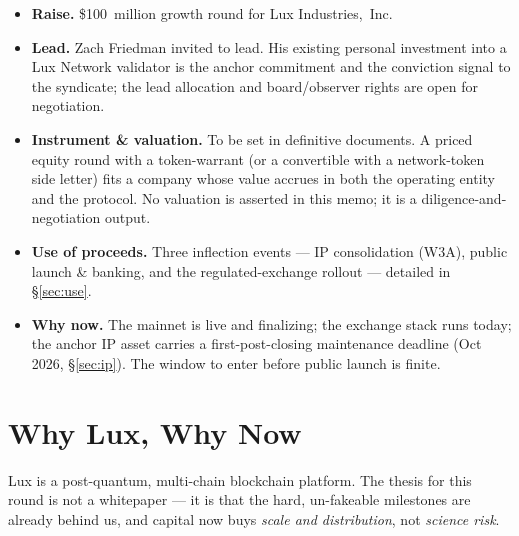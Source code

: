 \documentclass[11pt,a4paper]{article}
\begin{document}
\begin{itemize}[leftmargin=1.4em]
  \item \textbf{Raise.} \$100~million growth round for Lux Industries,~Inc.
  \item \textbf{Lead.} Zach Friedman invited to lead. His existing personal
  investment into a Lux Network validator is the anchor commitment and the
  conviction signal to the syndicate; the lead allocation and board/observer
  rights are open for negotiation.
  \item \textbf{Instrument \& valuation.} To be set in definitive documents.
  A priced equity round with a token-warrant (or a convertible with a
  network-token side letter) fits a company whose value accrues in both the
  operating entity and the protocol. No valuation is asserted in this memo;
  it is a diligence-and-negotiation output.
  \item \textbf{Use of proceeds.} Three inflection events --- IP
  consolidation (W3A), public launch \& banking, and the regulated-exchange
  rollout --- detailed in \S\ref{sec:use}.
  \item \textbf{Why now.} The mainnet is live and finalizing; the exchange
  stack runs today; the anchor IP asset carries a first-post-closing
  maintenance deadline (Oct 2026, \S\ref{sec:ip}). The window to enter
  before public launch is finite.
\end{itemize}

\section{Why Lux, Why Now}

Lux is a post-quantum, multi-chain blockchain platform. The thesis for this
round is not a whitepaper --- it is that the hard, un-fakeable milestones
are already behind us, and capital now buys \emph{scale and distribution},
not \emph{science risk}.
\end{document}
